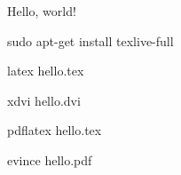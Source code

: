 \documentclass[12pt]{article}
\begin{document}
Hello, world!

sudo apt-get install texlive-full

latex hello.tex

xdvi hello.dvi

pdflatex hello.tex

evince hello.pdf
\end{document}
